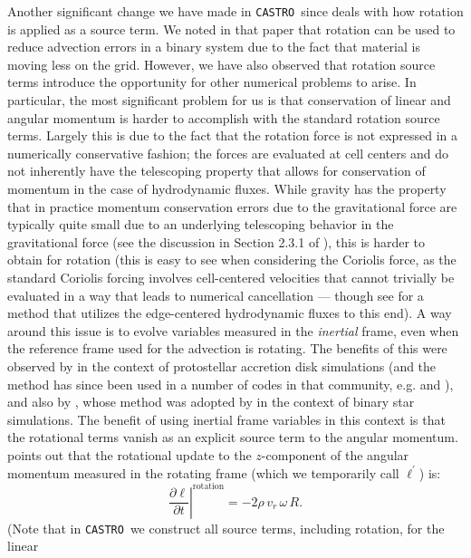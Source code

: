 \documentclass[twocolumn,numberedappendix]{../aastex6}
\newcommand{\castro}{\texttt{CASTRO}}
\begin{document}
Another significant change we have made in \castro\ since \citet{wdmergerI} deals
with how rotation is applied as a source term. We noted in that paper that rotation
can be used to reduce advection errors in a binary system due to the fact that
material is moving less on the grid. However, we have also observed that rotation
source terms introduce the opportunity for other numerical problems to arise. In
particular, the most significant problem for us is that conservation of linear and
angular momentum is harder to accomplish with the standard rotation source terms.
Largely this is due to the fact that the rotation force is not expressed in a numerically
conservative fashion; the forces are evaluated at cell centers and do not inherently
have the telescoping property that allows for conservation of momentum in the case
of hydrodynamic fluxes. While gravity has the property that in practice momentum
conservation errors due to the gravitational force are typically quite small due to
an underlying telescoping behavior in the gravitational force (see the discussion
in Section 2.3.1 of \cite{wdmergerI}), this is harder to obtain for rotation (this is
easy to see when considering the Coriolis force, as the standard Coriolis forcing
involves cell-centered velocities that cannot trivially be evaluated in a way that
leads to numerical cancellation --- though see \citet{audusse:2009} for a method that
utilizes the edge-centered hydrodynamic fluxes to this end). A way around this issue
is to evolve variables measured in the \textit{inertial} frame, even when the reference
frame used for the advection is rotating. The benefits of this were observed by
\citet{kley:1998} in the context of protostellar accretion disk simulations (and the
method has since been used in a number of codes in that community, e.g. \citet{NIRVANA}
and \citet{FARGO3D}), and also by \citet{call:2010}, whose method was adopted by
\citet{byerly:2014} in the context of binary star simulations. The benefit of using
inertial frame variables in this context is that the rotational terms vanish as an explicit
source term to the angular momentum. \citet{kley:1998} points out that the rotational update
to the $z$-component of the angular momentum measured in the rotating frame (which we
temporarily call $\ell^\prime$) is:
\begin{equation}
  \left.\frac{\partial \ell}{\partial t}\right|^{\text{rotation}} = -2\rho\, v_r\, \omega\, R.\label{eq:rotating-angular-momentum}
\end{equation}
(Note that in \castro\ we construct all source terms, including rotation, for the linear
\end{document}
